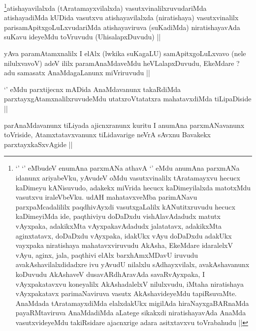 \begin{artha}
\footnote[1]{`\stext' `\stext' eMbudeV enumAna parxmANa athavA
  `\stext' eMdu anumAna parxmANa idanunx ariyabeVku, yAvudeV oMdu
  vasutxvinalilx tAratamayxvu hecucx kaDimeyu kANisuvudo, adakekx
  miVrida hecucx kaDimeyilalxda matotxMdu vasutxvu iraleVbeVku. udAH
  mahatavxveMba parimANavu parxpaMcadalililx paqdhivAyxdi
  vasutxgaLalilx kANutitxruvudu hecucx kaDimeyiMda ide, paqthiviyu
  doDaDxdu vishAlavAdadudx matutx vAyxpaka, adakikxMta
  vAyxpakavAdadudx jalatatavx, adakikxMta aginxtatavx, doDaDxdu
  vAyxpaka, idakUkx vAyu doDaDxdu adakUkx vayxpaka niratishaya
  mahatavxviruvudu AkAsha, EkeMdare idaralelxV vAyu, aginx, jala,
  paqthivi elAlx barxhAmxMDavU iruvudu avakAshavilalxdidadxre ivu
  yAvudU nilalxlu sAdhayxvilalx, avakAshavanunx koDuvudu AkAshaveV
  dusavARdhAravAda savaRvAyxpaka, I vAyxpakatavxvu koneyalilx
  AkAshadalelxV nilulxvudu, iMtaha niratishaya vAyxpakatavx
  parimaNaviruva vasutx AkAshavideyeMdu tapiRsuvaMte. AnaMdada
  tAratamayxdiMda elalxdakUkx migilAda hiraNayxgaBARnaMda
  payaRMtaviruva AnaMdadiMda aLatege sikakxdi niratishayavAda AnaMda
  vasutxvideyeMdu takiRsidare ajacnxrige  adara asitxtavxvu
  toVrabahudu ||}atishayavilalxda (tAratamayxvilalxda)
vasutxvinalilxruvudariMda atishayadiMda kUDida vasutxvu
atishayavilalxda (niratishaya) vasutxvinalilx
parisamApitxgoLuLxvudariMda atishayaviruva (suKadiMda) niratishayavAda
suKavu ideyeMdu toVruvudu (UhisalapxDuvudu) ||
\end{artha}

\begin{artha}
yAva paramAtamxnalilx I elAlx (lwkika suKagaLU) samApitxgoLuLxvavo
(nele nilulxvavoV) adeV ililx paramAnaMdaveMdu heVLalapxDuvudu,
EkeMdare ? adu samasatx AnaMdagaLanunx miVriruvudu ||
\end{artha}

\begin{artha}
`\stext' eMdu parxtijecnx mADida AnaMdavanunx takaRdiMda
  parxtayxgAtamxnalilxruvudeMdu utatxroVtatatxra mahatavxdiMda
  tiLipaDiside ||
\end{artha}


\begin{artha}
parAnaMdavanunx tiLiyada ajicnxranunx kuritu I anumAna parxmANavanunx
toVriside, Atamxtatavxvanunx tiLidavarige neVrA sAvxnu Bavakekx
parxtayxkaSxvAgide ||
\end{artha}

